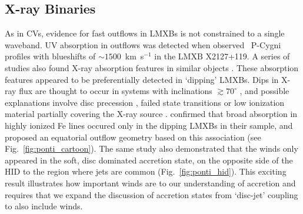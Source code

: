 

\subsection{X-ray Binaries}
\label{sec:xrb_winds}

As in CVs, evidence for fast outflows in LMXBs is not constrained to 
a single waveband. UV absorption in outflows was detected when
\cite{ioannau2003} observed \civfull\ P-Cygni profiles with blueshifts 
of $\sim1500$~km~s$^{-1}$ in the LMXB X2127+119. 
A series of studies also found X-ray absorption features in similar objects 
\citep{ueda1998,kotani2000,parmar2002}. 
These absorption features appeared to be preferentially detected
in `dipping' LMXBs. Dips in X-ray flux are thought to occur
in systems with inclinations $\gtrsim70^\circ$ 
\citep{vanderhooft1998,tanaka2003,church2005}, and possible explanations
involve disc precession \citep{barnard2006,shaw2013}, 
failed state transitions \citep{soleri2013,shaw2016} or low ionization material 
partially covering the X-ray source \citep{tanaka2003}.
\cite{ponti2012} confirmed that broad absorption in highly ionized Fe lines 
occured only in the dipping LMXBs in their sample, and proposed an equatorial 
outflow geometry based on this association (see Fig.~\ref{fig:ponti_cartoon}). 
The same study also demonstrated that the winds only appeared in the soft, 
disc dominated accretion state, on the opposite side of the HID to the
region where jets are common (Fig.~\ref{fig:ponti_hid}). 
This exciting result illustrates how
important winds are to our understanding of accretion and requires that
we expand the discussion of accretion states from `disc-jet' coupling
to also include winds.

